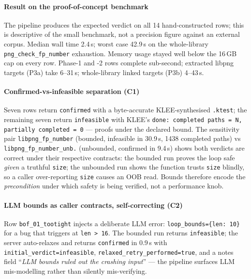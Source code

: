 \documentclass[3p,times,procedia]{elsarticle}
\begin{document}
\paragraph{Result on the proof-of-concept benchmark} The pipeline produces the expected verdict on all 14 hand-constructed rows; this is descriptive of the small benchmark, not a precision figure against an external corpus. Median wall time 2.4\,s; worst case 42.9\,s on the whole-library \texttt{png\_check\_fp\_number} exhaustion. Memory usage stayed well below the 16\,GB cap on every row. Phase-1 and -2 rows complete sub-second; extracted libpng targets (P3a) take 6--31\,s; whole-library linked targets (P3b) 4--43\,s.

\paragraph{Confirmed-vs-infeasible separation (C1)} Seven rows return \texttt{confirmed} with a byte-accurate KLEE-synthesised \texttt{.ktest}; the remaining seven return \texttt{infeasible} with KLEE's \texttt{done: completed paths = N, partially completed = 0} --- proofs under the declared bound. The sensitivity pair \texttt{libpng\_fp\_number} (bounded, infeasible in 30.9\,s, 1438 completed paths) vs \texttt{libpng\_fp\_number\_unb.} (unbounded, confirmed in 9.4\,s) shows both verdicts are correct under their respective contracts: the bounded run proves the loop safe \emph{given} a truthful \texttt{size}; the unbounded run shows the function trusts \texttt{size} blindly, so a caller over-reporting \texttt{size} causes an OOB read. Bounds therefore encode the \emph{precondition} under which safety is being verified, not a performance knob.

\paragraph{LLM bounds as caller contracts, self-correcting (C2)} Row \texttt{bof\_01\_tootight} injects a deliberate LLM error: \texttt{loop\_bounds=\{len: 10\}} for a bug that triggers at \texttt{len > 16}. The bounded run returns \texttt{infeasible}; the server auto-relaxes and returns \texttt{confirmed} in 0.9\,s with \texttt{initial\_verdict=infeasible}, \texttt{relaxed\_retry\_performed=true}, and a notes field ``\emph{LLM bounds ruled out the crashing input}'' --- the pipeline surfaces LLM mis-modelling rather than silently mis-verifying.
\end{document}
